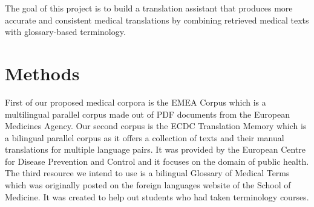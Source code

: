 \documentclass[fleqn,moreauthors,10pt]{ds_report}
\begin{document}
The goal of this project is to build a translation assistant that produces more accurate and consistent medical translations by combining retrieved medical texts with glossary-based terminology.

\section*{Methods}

First of our proposed medical corpora is the EMEA Corpus which is a multilingual parallel corpus made out of PDF documents from the European Medicines Agency\cite{clarin_emea_2015}. Our second corpus is the ECDC Translation Memory which is a bilingual parallel corpus as it offers a collection of texts and their manual translations for multiple language pairs. It was provided by the European Centre for Disease Prevention and Control and it focuses on the domain of public health\cite{clarin_ecdc_tm_2015}. The third resource we intend to use is a bilingual Glossary of Medical Terms which was originally posted on the foreign languages website of the School of Medicine. It was created to help out students who had taken terminology courses\cite{clarin_medical_glossary_2016}. 




\end{document}
